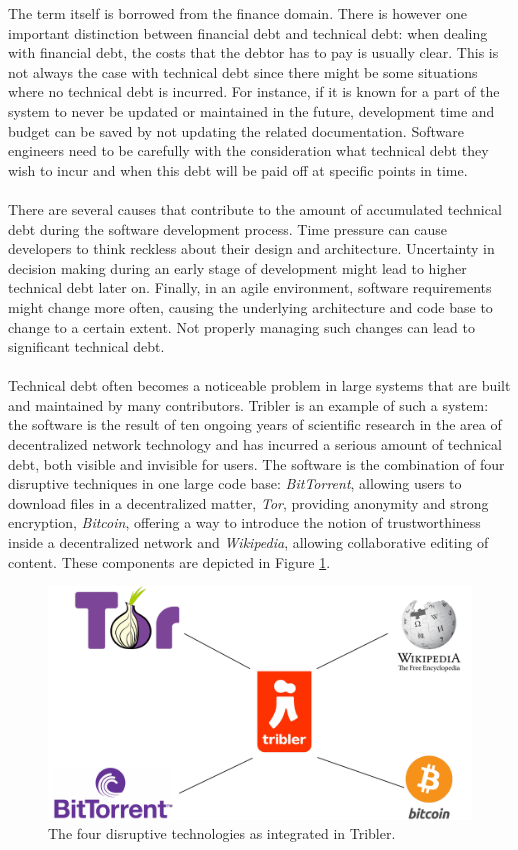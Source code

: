 The term itself is borrowed from the finance domain\cite{guo2011portfolio}.
There is however one important distinction between financial debt and technical debt: when dealing with financial debt, the costs that the debtor has to pay is usually clear.
This is not always the case with technical debt since there might be some situations where no technical debt is incurred.
For instance, if it is known for a part of the system to never be updated or maintained in the future, development time and budget can be saved by not updating the related documentation.
Software engineers need to be carefully with the consideration what technical debt they wish to incur and when this debt will be paid off at specific points in time.\\\\
There are several causes that contribute to the amount of accumulated technical debt during the software development process\cite{martini2014architecture}. Time pressure can cause developers to think reckless about their design and architecture. Uncertainty in decision making during an early stage of development might lead to higher technical debt later on. Finally, in an agile environment, software requirements might change more often, causing the underlying architecture and code base to change to a certain extent. Not properly managing such changes can lead to significant technical debt.\\\\
Technical debt often becomes a noticeable problem in large systems that are built and maintained by many contributors. Tribler is an example of such a system: the software is the result of ten ongoing years of scientific research in the area of decentralized network technology and has incurred a serious amount of technical debt, both visible and invisible for users.
The software is the combination of four disruptive techniques in one large code base: \emph{BitTorrent}, allowing users to download files in a decentralized matter, \emph{Tor}, providing anonymity and strong encryption, \emph{Bitcoin}, offering a way to introduce the notion of trustworthiness inside a decentralized network and \emph{Wikipedia}, allowing collaborative editing of content. These components are depicted in Figure \ref{fig:tribler-connections}.\\

\begin{figure}[t]
	\centering
	\includegraphics[width=0.6\columnwidth]{images/introduction/tribler_connections}
	\caption{The four disruptive technologies as integrated in Tribler.}
	\label{fig:tribler-connections}
\end{figure}

